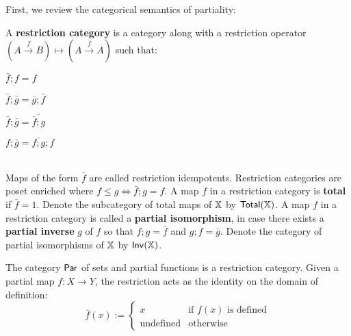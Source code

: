 First, we review the categorical semantics of partiality:
\label{sec:rest}
\begin{definition}
A {\bf restriction category} is a category along with a restriction operator 
$
(A \xrightarrow{f} B )\mapsto (A \xrightarrow{\bar f} A)
$
such that:\\

\noindent\hspace*{-.85cm}
\begingroup
\setlength{\columnsep}{-25pt}
\setlength{\parindent}{0pt}
\begin{minipage}{16cm}
\begin{multicols}{4}
\begin{enumerate}[label={\bf [R.\arabic*]}, ref={\bf [R.\arabic*]}, labelindent=0pt, itemsep=0pt]
\item $\bar f ; f  = f$
\label{R.1}
\item $\bar f ; \bar g = \bar g ; \bar f$
\label{R.2}
\item $\bar f ; \bar g = \bar{\bar f ;  g}$
\label{R.3}
\item $f ; \bar g = \bar{f; g} ; f$
\label{R.4}
\end{enumerate}
\end{multicols}
\end{minipage}
\endgroup\\

\noindent
Maps of the form $\bar f$ are called restriction idempotents.
Restriction categories are poset enriched where $f \leq g \iff \bar f ; g = f$.
A map $f$ in a restriction category is {\bf total} if $\bar f =1$.  Denote the subcategory of total maps of $\mathbb{X}$ by $\mathsf{Total}(\mathbb{X})$.
A map $f$ in a restriction category is called a {\bf partial isomorphism}, in case there exists a {\bf partial inverse} $g$ of $f$ so that $f;g=\bar f$ and $g;f = \bar g$. Denote the category of partial isomorphisms of $\mathbb{X}$ by $\mathsf{Inv}(\mathbb{X})$.
\end{definition}
\begin{example}
The category $\mathsf{Par}$ of sets and partial functions is a restriction category.   Given a partial map $f:X\to Y$, the restriction acts as the identity on the domain of definition:
$$
\bar f (x):=
\begin{cases}
x & \text{if }f(x)\text{ is defined}\\
\text{undefined} & \text{otherwise}
\end{cases}
$$
\end{example}
